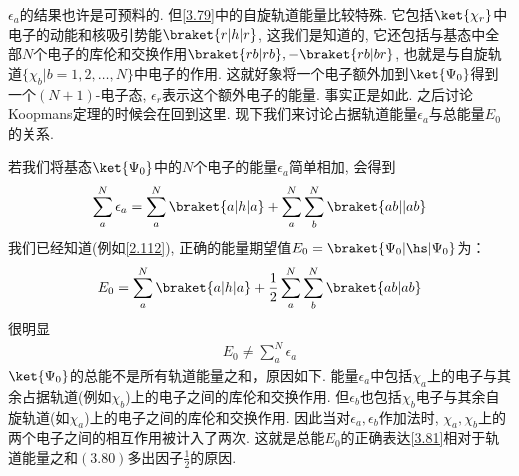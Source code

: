 $\epsilon_a$的结果也许是可预料的. 但\autoref{3.79}中的自旋轨道能量比较特殊. 
它包括$\ket{\chi_r}$中电子的动能和核吸引势能$\braket{r|h|r}$, 这我们是知道的, 
它还包括与\hft 基态中全部$N$个电子的库伦和交换作用$\braket{rb|rb},-\braket{rb|br}$, 也就是与自旋轨道$\{\chi_b|b=1,2,\ldots,N\}$中电子的作用. 
这就好象将一个电子额外加到$\ket{\Psi_0}$得到一个$(N+1)$-电子态, $\epsilon_r$表示这个额外电子的能量. 
事实正是如此. 之后讨论Koopmans定理的时候会在回到这里. 
现下我们来讨论占据轨道能量$\epsilon_a$与总能量$E_0$的关系.

若我们将基态$\ket{\Psi_0}$中的$N$个电子的能量$\epsilon_a$简单相加, 
会得到
\begin{align}
	\sum_{a}^{N}\epsilon_a = \sum_a^N\braket{a|h|a} + \sum_a^N\sum_b^N\braket{ab||ab}
\end{align}
我们已经知道(例如\autoref{2.112}), 
正确的能量期望值$E_0 = \braket{\Psi_0|\hs|\Psi_0}$为：
\begin{align}
	\label{3.81}
	E_0 = \sum_a^N\braket{a|h|a} + \frac{1}{2}\sum_a^N\sum_b^N\braket{ab|ab}
\end{align}
很明显
\begin{align}
	E_0 \neq \sum_a^N \epsilon_a
\end{align}
$\ket{\Psi_0}$的总能不是所有轨道能量之和，原因如下. 
能量$\epsilon_a$中包括$\chi_a$上的电子与其余占据轨道(例如$\chi_b$)上的电子之间的库伦和交换作用. 
但$\epsilon_b$也包括$\chi_b$电子与其余自旋轨道(如$\chi_a$)上的电子之间的库伦和交换作用. 
因此当对$\epsilon_a,\epsilon_b$作加法时, $\chi_a,\chi_b$上的两个电子之间的相互作用被计入了两次. 这就是总能$E_0$的正确表达\autoref{3.81}相对于轨道能量之和$(3.80)$多出因子$\frac{1}{2}$的原因.

